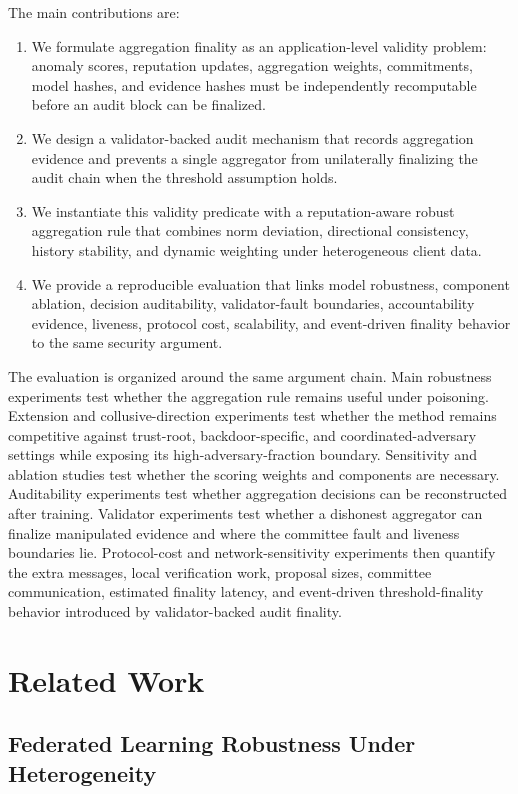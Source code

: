 \documentclass[preprint,12pt]{elsarticle}
\begin{document}
The main contributions are:
\begin{enumerate}
  \item We formulate aggregation finality as an application-level validity problem: anomaly scores, reputation updates, aggregation weights, commitments, model hashes, and evidence hashes must be independently recomputable before an audit block can be finalized.
  \item We design a validator-backed audit mechanism that records aggregation evidence and prevents a single aggregator from unilaterally finalizing the audit chain when the threshold assumption holds.
  \item We instantiate this validity predicate with a reputation-aware robust aggregation rule that combines norm deviation, directional consistency, history stability, and dynamic weighting under heterogeneous client data.
  \item We provide a reproducible evaluation that links model robustness, component ablation, decision auditability, validator-fault boundaries, accountability evidence, liveness, protocol cost, scalability, and event-driven finality behavior to the same security argument.
\end{enumerate}

The evaluation is organized around the same argument chain. Main robustness experiments test whether the aggregation rule remains useful under poisoning. Extension and collusive-direction experiments test whether the method remains competitive against trust-root, backdoor-specific, and coordinated-adversary settings while exposing its high-adversary-fraction boundary. Sensitivity and ablation studies test whether the scoring weights and components are necessary. Auditability experiments test whether aggregation decisions can be reconstructed after training. Validator experiments test whether a dishonest aggregator can finalize manipulated evidence and where the committee fault and liveness boundaries lie. Protocol-cost and network-sensitivity experiments then quantify the extra messages, local verification work, proposal sizes, committee communication, estimated finality latency, and event-driven threshold-finality behavior introduced by validator-backed audit finality.

\section{Related Work}

\subsection{Federated Learning Robustness Under Heterogeneity}
\end{document}
